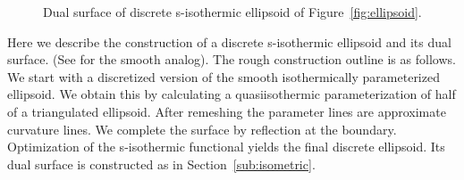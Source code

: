 \documentclass[Thesis.tex]{subfiles}
\begin{document}
\begin{figure}
\centering
{}
\caption{Dual surface of discrete s-isothermic ellipsoid of Figure~\ref{fig:ellipsoid}. }
\label{fig:ellipsoid_dual} 
\end{figure}

Here we describe the construction of a discrete s-isothermic ellipsoid and 
its dual surface. (See \cite[p.~202]{Hertrich2003} for the smooth analog).
The rough construction outline is as follows. We start with a discretized version
of the smooth isothermically parameterized ellipsoid. We obtain this by calculating a 
quasiisothermic parameterization of half of a triangulated ellipsoid. After remeshing 
the parameter lines are approximate curvature lines. We complete the surface by reflection
at the boundary. 
Optimization of the s-isothermic functional yields the final discrete ellipsoid. Its 
dual surface is constructed as in Section~\ref{sub:isometric}.
\end{document}
